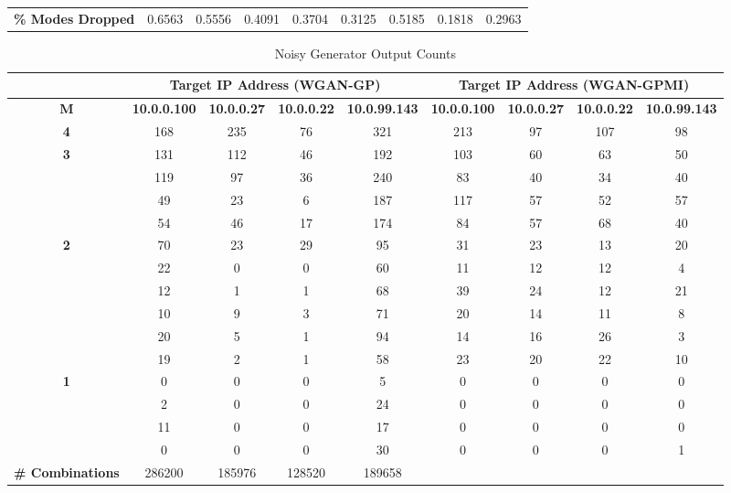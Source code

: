 \begin{table}[!htbp]
\begin{adjustbox}{angle=90}
\begin{tabular}{ccccccccc}
			\multicolumn{1}{l|}{\textbf{\% Modes Dropped}} & \multicolumn{1}{c|}{0.6563} & \multicolumn{1}{c|}{0.5556} & \multicolumn{1}{c|}{0.4091} & \multicolumn{1}{c|}{0.3704} & \multicolumn{1}{c|}{0.3125} & \multicolumn{1}{c|}{0.5185} & \multicolumn{1}{c|}{0.1818} & \multicolumn{1}{c}{0.2963}
		\end{tabular}
	\end{adjustbox}
\end{table}


\begin{table}[!htbp]
	\centering
	\caption{Noisy Generator Output Counts}
	\label{tab:random_outputs}
	\begin{adjustbox}{angle=90}
		\begin{tabular}{c|c|c|c|c|c|c|c|c}
			\multicolumn{1}{c|}{} & \multicolumn{4}{c|}{\textbf{Target IP Address (WGAN-GP)}} & \multicolumn{4}{c}{\textbf{Target IP Address (WGAN-GPMI)}} \\ \hline

			\textbf{M} & \multicolumn{1}{l|}{\textbf{10.0.0.100}} & \multicolumn{1}{l|}{\textbf{10.0.0.27}} & \multicolumn{1}{l|}{\textbf{10.0.0.22}} & \multicolumn{1}{l|}{\textbf{10.0.99.143}} & \multicolumn{1}{l|}{\textbf{10.0.0.100}} & \multicolumn{1}{l|}{\textbf{10.0.0.27}} & \multicolumn{1}{l|}{\textbf{10.0.0.22}} & \multicolumn{1}{l}{\textbf{10.0.99.143}} \\
			\hline
			\textbf{4} & 168 & 235 & 76 & 321 & 213 & 97 & 107 & 98 \\
			\hline
			\multirow{4}{*}{\textbf{3}} & 131 & 112 & 46 & 192 & 103 & 60 & 63 & 50 \\
			& 119 & 97 & 36  & 240 & 83 & 40 & 34 & 40 \\
			& 49  & 23 & 6  & 187  & 117 & 57  & 52 & 57 \\
			& 54  & 46 & 17 & 174  & 84  & 57  & 68 & 40 \\
			\hline
			\multirow{6}{*}{\textbf{2}} & 70 & 23 & 29 & 95 & 31 & 23 & 13 & 20 \\
			& 22  & 0 & 0  & 60 & 11 & 12 & 12 & 4  \\
			& 12  & 1 & 1  & 68 & 39 & 24 & 12 & 21 \\
			& 10  & 9 & 3  & 71 & 20 & 14 & 11 & 8  \\
			& 20  & 5 & 1  & 94 & 14 & 16 & 26 & 3  \\
			& 19  & 2 & 1  & 58 & 23 & 20 & 22 & 10 \\
			\hline
			\multirow{4}{*}{\textbf{1}} & 0  & 0  & 0  & 5  & 0  & 0  & 0  & 0  \\
			& 2   & 0 & 0  & 24 & 0  & 0  & 0  & 0  \\
			& 11  & 0 & 0  & 17 & 0  & 0  & 0  & 0  \\
			& 0   & 0 & 0  & 30 & 0  & 0  & 0  & 1  \\
			\hline
			\multicolumn{1}{l|}{\textbf{\# Combinations}} & 286200 & 185976 & 128520 & 189658 & \multicolumn{1}{l|}{} & \multicolumn{1}{l|}{} & \multicolumn{1}{l|}{} & \multicolumn{1}{l}{}
		\end{tabular}
	\end{adjustbox}
\end{table}


